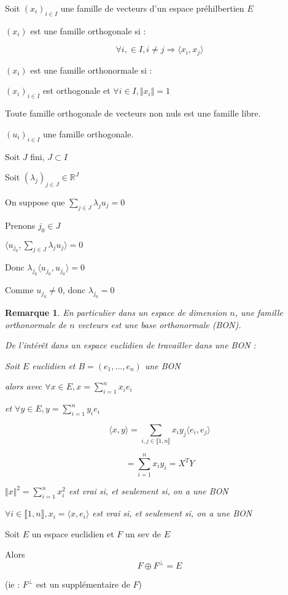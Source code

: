 \documentclass[a4paper,12pt]{book}
\newcommand{\Def}[2]{\begin{tcolorbox}[sharp corners, colback=white,colframe=blue!90!black!75, title=Définition : #1]#2\end{tcolorbox}}
\newcommand{\Thr}[2]{\begin{tcolorbox}[sharp corners, colback=white,colframe=red!90!black!75, title=Théorème : #1]#2\end{tcolorbox}}
\newcommand{\Prop}[2]{\begin{tcolorbox}[sharp corners, colback=white,colframe=red!90!black!75, title=Proposition : #1]#2\end{tcolorbox}}
\newcommand{\Pre}[1]{\begin{tcolorbox}[sharp corners, colback=white,colframe=green!60!green!30!black!75, title=Preuve]#1\end{tcolorbox}}
\newtheorem{Rem}{Remarque}[section]
\def\R{\mathbb{R}}
\begin{document}
\Def{Familles orthogonales}{Soit $(x_i)_{i\in I}$ une famille de vecteurs d'un espace préhilbertien $E$
\par $(x_i)$ est une famille orthogonale si :
\par $$\forall i,\in I, i\neq j \Rightarrow \langle x_i, x_j\rangle$$
\par $(x_i)$ est une famille orthonormale si :
\par $(x_i)_{i\in I}$ est orthogonale et $\forall i\in I, \Vert x_i\Vert = 1$}
\Prop{}{Toute famille orthogonale de vecteurs non nuls est une famille libre.}
\Pre{$(u_i)_{i\in I}$ une famille orthogonale.
\par Soit $J$ fini, $J\subset I$
\par Soit $(\lambda_j)_{j\in J}\in\R^J$
\par On suppose que $\sum\limits_{j\in J}\lambda_j u_j = 0$
\par Prenons $j_0\in J$
\par $\langle u_{j_0}, \sum\limits_{j\in J}\lambda_ju_j\rangle = 0$
\par Donc $\lambda_{j_0}\langle u_{j_0}, u_{j_0}\rangle  = 0$
\par Comme $u_{j_0}\neq 0$, donc $\lambda_{j_0}=0$}
\begin{Rem}
En particulier dans un espace de dimension $n$, une famille orthonormale de $n$ vecteurs est une base orthonormale (BON).
\par De l'intérêt dans un espace euclidien de travailler dans une BON :
\par Soit $E$ euclidien et $B=(e_1,..., e_n)$ une BON
\par alors avec $\forall x\in E, x  = \sum\limits_{i=1}^nx_i e_i$
\par et $\forall y\in E, y = \sum\limits_{i=1}^n y_ie_i$
\par $$\langle x, y\rangle = \sum\limits_{i, j\in\llbracket 1, n\rrbracket}x_iy_j\langle e_i, e_j\rangle$$
\par $$  = \sum\limits_{i=1}^nx_iy_i = X^TY$$
\par $\Vert x\Vert^2 = \sum\limits_{i=1}^nx_i^2$ est vrai si, et seulement si, on a une BON
\par $\forall i\in\llbracket 1, n\rrbracket, x_i = \langle x, e_i\rangle$ est vrai si, et seulement si, on a une BON
\end{Rem}
\Thr{}{Soit $E$ un espace euclidien et $F$ un sev de $E$
\par Alors $$F\oplus F^\perp = E$$
\par (ie : $F^\perp$ est un supplémentaire de $F$)}
\end{document}
